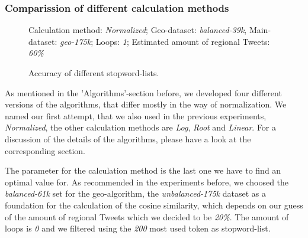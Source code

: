 \documentclass[../Main.tex]{subfiles}
\begin{document}
\subsubsection{Comparission of different calculation methods}
\begin{figure}
\begin{center}
\end{center}
  \label{geo_graph1}
Calculation method: \textit{Normalized}; Geo-dataset: \textit{balanced-39k}, Main-dataset: \textit{geo-175k}; Loops: \textit{1}; Estimated amount of regional Tweets: \textit{60\%}
  \caption{Accuracy of different stopword-lists.}

\end{figure}


As mentioned in the 'Algorithms'-section before, we developed four different versions of the algorithms, that differ mostly in the way of normalization. We named our first attempt, that we also used in the previous experiments, \emph{Normalized}, the other calculation methods are \emph{Log}, \emph{Root} and \emph{Linear}. For a discussion of the details of the algorithms, please have a look at the corresponding section. 

The parameter for the calculation method is the last one we have to find an optimal value for. As recommended in the experiments before, we choosed the \emph{balanced-61k} set for the geo-algorithm, the \emph{unbalanced-175k} dataset as a foundation for the calculation of the cosine similarity, which depends on our guess of the amount of regional Tweets which we  decided to be \emph{20\%}. The amount of loops is \emph{0} and we filtered using the \emph{200} most used token as stopword-list.


\end{document}
